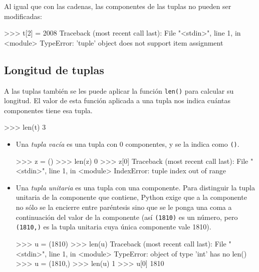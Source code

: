 Al igual que con las cadenas, las componentes de las tuplas no pueden ser
modificadas:

\begin{codigo-python-sn}
>>> t[2] = 2008
Traceback (most recent call last):
  File "<stdin>", line 1, in <module>
TypeError: 'tuple' object does not support item assignment
\end{codigo-python-sn}

\subsection{Longitud de tuplas}

A las tuplas también se les puede aplicar la función \lstinline+len()+
para calcular su longitud. El valor de esta función aplicada a
una tupla nos indica cuántas componentes tiene esa tupla.

\begin{codigo-python-sn}
>>> len(t)
3
\end{codigo-python-sn}


\begin{itemize}
\item Una {\it tupla vacía} es una tupla con $0$ componentes, y se la
indica como \lstinline+()+.

\begin{codigo-python-sn}
>>> z = ()
>>> len(z)
0
>>> z[0]
Traceback (most recent call last):
  File "<stdin>", line 1, in <module>
IndexError: tuple index out of range
\end{codigo-python-sn}

\item Una {\it tupla unitaria} es una tupla con una componente. Para
distinguir la tupla unitaria de la componente que contiene, Python exige
que a la componente no sólo se la encierre entre paréntesis sino que se le
ponga una coma a continuación del valor de la componente (así
\lstinline+(1810)+ es un número, pero \lstinline+(1810,)+ es la tupla
unitaria cuya única componente vale 1810).

\begin{codigo-python-sn}
>>> u = (1810)
>>> len(u)
Traceback (most recent call last):
  File "<stdin>", line 1, in <module>
TypeError: object of type 'int' has no len()
>>> u = (1810,)
>>> len(u)
1
>>> u[0]
1810
\end{codigo-python-sn}
\end{itemize}

